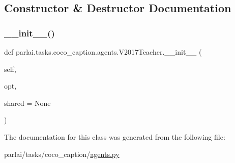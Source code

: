 \subsection{Constructor \& Destructor Documentation}
\mbox{\label{classparlai_1_1tasks_1_1coco__caption_1_1agents_1_1V2017Teacher_a9e0aff09f69cd575af3238cab3a1d623}} 
\subsubsection{\texorpdfstring{\+\_\+\+\_\+init\+\_\+\+\_\+()}{\_\_init\_\_()}}
{\footnotesize\ttfamily def parlai.\+tasks.\+coco\+\_\+caption.\+agents.\+V2017\+Teacher.\+\_\+\+\_\+init\+\_\+\+\_\+ (\begin{DoxyParamCaption}\item[{}]{self,  }\item[{}]{opt,  }\item[{}]{shared = {\ttfamily None} }\end{DoxyParamCaption})}



The documentation for this class was generated from the following file\+:\begin{DoxyCompactItemize}
\item 
parlai/tasks/coco\+\_\+caption/\hyperlink{parlai_2tasks_2coco__caption_2agents_8py}{agents.\+py}\end{DoxyCompactItemize}
